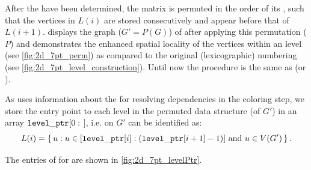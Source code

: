 After the \levels have been determined, the matrix is permuted in the order of its \levels, such that the vertices in $L(i)$ are stored consecutively and appear before that of $L(i+1)$.  displays the graph ($G' = P(G)$) of \stex after applying this permutation ($P$) and demonstrates the enhanced spatial locality of the vertices within an level (see \cref{fig:2d_7pt_perm}) as compared to the original (lexicographic) numbering (see \cref{fig:2d_7pt_level_construction}).  Until now the procedure is the same as \BFS (or \RCM). 

As \RACE uses information about the \levels for resolving dependencies in the coloring step, we store the entry point to each level in the permuted data structure (of $G'$) in an array ${\tt level\_ptr}[0:$ \totalLvl$]$, i.e. \levels on $G'$ can be identified as:
\begin{equation*}
	L(i) = \set{ u : u \in [{\tt level\_ptr} [i]:({\tt level\_ptr} [i+1]-1)] \text{ and } u \in V(G')} .
\end{equation*}

The entries of \levelPtr for \stex are shown in \cref{fig:2d_7pt_levelPtr}. 
 
